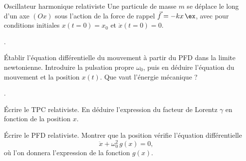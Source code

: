 \begin{exo}[PC][3][TD]{Oscillateur harmonique relativiste}
Une particule de masse $m$ se déplace le long d'un axe $(O x)$ sous l'action de la force de rappel $\Vec{f} =-k x \,\ex$, avec pour conditions initiales $x(t=0)=x_0$ et $\dot{x}(t=0)=0$.

.
\begin{quest}
    \item 
    Établir l'équation différentielle du mouvement à partir du PFD dans la limite newtonienne. Introduire la pulsation propre $\omega_0$, puis en déduire l'équation du mouvement et la position $x(t)$. Que vaut l'énergie mécanique ?
  \end{quest}
  .
\begin{quest}
  \item	
    Écrire le TPC relativiste. En déduire l'expression du facteur de Lorentz $\gamma$ 
    en fonction de la position $x$. 
    

    \item Écrire le PFD relativiste. Montrer que la position vérifie l’équation différentielle 
    \begin{equation}
        \ddot{x} + \omega_0^2 \,g(x) = 0,
    \end{equation}
    où l’on donnera l’expression de la fonction $g(x)$.
    

\end{quest}
\end{exo}
